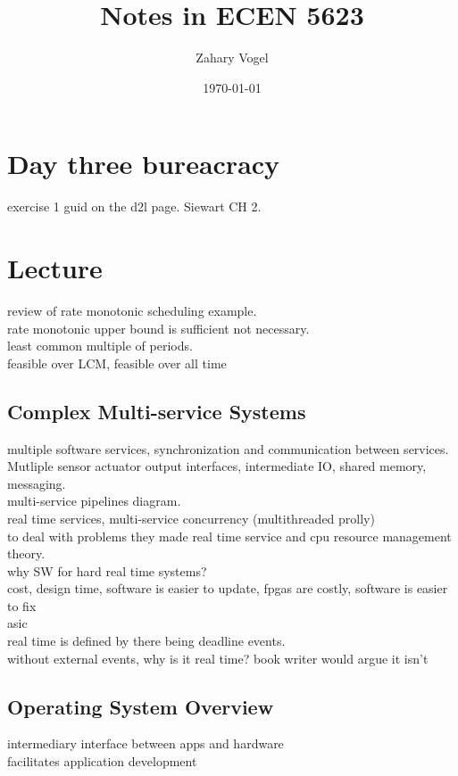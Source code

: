 \documentclass{article}
\author{Zahary Vogel}
\date{\today}
\title{Notes in ECEN 5623}
\begin{document}
\maketitle


\section*{Day three bureacracy}
exercise 1 guid on the d2l page. Siewart CH 2.\\

\section*{Lecture}
review of rate monotonic scheduling example.\\
rate monotonic upper bound is sufficient not necessary.\\
least common multiple of periods.\\
feasible over LCM, feasible over all time\\

\subsection*{Complex Multi-service Systems}
multiple software services, synchronization and communication between services. Mutliple sensor actuator output interfaces, intermediate IO, shared memory, messaging.\\

multi-service pipelines diagram.\\

real time services, multi-service concurrency (multithreaded prolly)\\

to deal with problems they made real time service and cpu resource management theory.\\

why SW for hard real time systems?\\
cost, design time, software is easier to update, fpgas are costly, software is easier to fix\\
asic\\

real time is defined by there being deadline events.\\
without external events, why is it real time? book writer would argue it isn't\\

\subsection*{Operating System Overview}
intermediary interface between apps and hardware\\
facilitates application development\\
\end{document}
